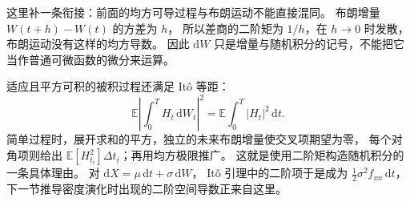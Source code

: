 这里补一条衔接：前面的均方可导过程与布朗运动不能直接混同。
布朗增量 $W(t+h)-W(t)$ 的方差为 $h$，
所以差商的二阶矩为 $1/h$，在 $h\to0$ 时发散，布朗运动没有这样的均方导数。
因此 $\mathrm dW$ 只是增量与随机积分的记号，不能把它当作普通可微函数的微分来运算。

适应且平方可积的被积过程还满足 Itô 等距：
\[
\mathbb E\left|\int_0^T H_t\,\mathrm dW_t\right|^2
=\mathbb E\int_0^T|H_t|^2\,\mathrm dt.
\]
简单过程时，展开求和的平方，独立的未来布朗增量使交叉项期望为零，
每个对角项则给出 $\mathbb E[H_{t_i}^2]\Delta t_i$；再用均方极限推广。
这就是使用二阶矩构造随机积分的一条具体理由。
对 $\mathrm dX=\mu\,\mathrm dt+\sigma\,\mathrm dW$，
Itô 引理中的二阶项于是成为 $\tfrac12\sigma^2 f_{xx}\,\mathrm dt$，
下一节推导密度演化时出现的二阶空间导数正来自这里。
